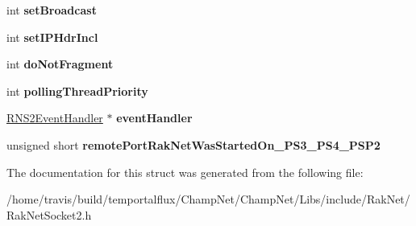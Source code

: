 \begin{DoxyCompactItemize}
\item 
\hypertarget{struct_rak_net_1_1_r_n_s2___berkley_bind_parameters_a364ff096e4a82e0616b8df68c2d59cf5}{int {\bfseries set\-Broadcast}}\label{struct_rak_net_1_1_r_n_s2___berkley_bind_parameters_a364ff096e4a82e0616b8df68c2d59cf5}

\item 
\hypertarget{struct_rak_net_1_1_r_n_s2___berkley_bind_parameters_a121ed15b1ab2aaf8874e8e526f3fd969}{int {\bfseries set\-I\-P\-Hdr\-Incl}}\label{struct_rak_net_1_1_r_n_s2___berkley_bind_parameters_a121ed15b1ab2aaf8874e8e526f3fd969}

\item 
\hypertarget{struct_rak_net_1_1_r_n_s2___berkley_bind_parameters_a2ca118ddc72e5b0cc45a2d4370f67779}{int {\bfseries do\-Not\-Fragment}}\label{struct_rak_net_1_1_r_n_s2___berkley_bind_parameters_a2ca118ddc72e5b0cc45a2d4370f67779}

\item 
\hypertarget{struct_rak_net_1_1_r_n_s2___berkley_bind_parameters_a96d48e3a88dc149518a041360a0ab18d}{int {\bfseries polling\-Thread\-Priority}}\label{struct_rak_net_1_1_r_n_s2___berkley_bind_parameters_a96d48e3a88dc149518a041360a0ab18d}

\item 
\hypertarget{struct_rak_net_1_1_r_n_s2___berkley_bind_parameters_a98d03ab4f5de9ff59de38494554898c6}{\hyperlink{class_rak_net_1_1_r_n_s2_event_handler}{R\-N\-S2\-Event\-Handler} $\ast$ {\bfseries event\-Handler}}\label{struct_rak_net_1_1_r_n_s2___berkley_bind_parameters_a98d03ab4f5de9ff59de38494554898c6}

\item 
\hypertarget{struct_rak_net_1_1_r_n_s2___berkley_bind_parameters_a9ca29ec5ad62d97d4c68a622cf16c3e3}{unsigned short {\bfseries remote\-Port\-Rak\-Net\-Was\-Started\-On\-\_\-\-P\-S3\-\_\-\-P\-S4\-\_\-\-P\-S\-P2}}\label{struct_rak_net_1_1_r_n_s2___berkley_bind_parameters_a9ca29ec5ad62d97d4c68a622cf16c3e3}

\end{DoxyCompactItemize}


The documentation for this struct was generated from the following file\-:\begin{DoxyCompactItemize}
\item 
/home/travis/build/temportalflux/\-Champ\-Net/\-Champ\-Net/\-Libs/include/\-Rak\-Net/Rak\-Net\-Socket2.\-h\end{DoxyCompactItemize}
